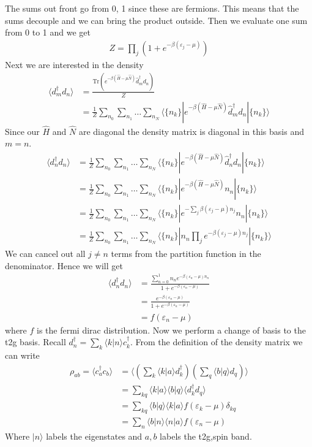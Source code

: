 \documentclass[11pt]{article}
\begin{document}
The sums out front go from 0, 1 since these are fermions. This means that the sums decouple and we can bring the product outside. Then we evaluate one sum from 0 to 1 and we get
\begin{gather}
    Z = \prod_j \left(1 + e^{-\beta(\varepsilon_j - \mu)}\right)
\end{gather}
Next we are interested in the density
\begin{align}
    \langle d^\dagger_m d_n \rangle &= \frac{\text{Tr}\left(e^{-\beta(\hat H - \mu \hat N)}\hat d_m^\dagger d_n\right)}{Z} \\\nonumber
    &= \frac{1}{Z} \sum_{n_0}\sum_{n_1}\ldots\sum_{n_N} \langle \{n_k\}|e^{-\beta(\hat H - \mu \hat N)}\hat d_m^\dagger d_n|\{n_k\}\rangle
\end{align}
Since our $\hat H$ and $\hat N$ are diagonal the density matrix is diagonal in this basis and $m = n$.
\begin{align}
    \langle d^\dagger_n d_n \rangle &=\frac{1}{Z}\sum_{n_0}\sum_{n_1}\ldots\sum_{n_N} \langle \{n_k\}|e^{-\beta(\hat H - \mu \hat N)}\hat d_n^\dagger d_n|\{n_k\}\rangle \\\nonumber
    &=\frac{1}{Z} \sum_{n_0}\sum_{n_1}\ldots\sum_{n_N} \langle \{n_k\}|e^{-\beta(\hat H - \mu \hat N)}n_n|\{n_k\}\rangle \\\nonumber
    &=\frac{1}{Z} \sum_{n_0}\sum_{n_1}\ldots\sum_{n_N} \langle \{n_k\}|e^{-\sum_j\beta(\varepsilon_j - \mu)n_j}n_n|\{n_k\}\rangle \\\nonumber
    &=\frac{1}{Z} \sum_{n_0}\sum_{n_1}\ldots\sum_{n_N} \langle \{n_k\}|n_n \prod_je^{-\beta(\varepsilon_j - \mu)n_j}|\{n_k\}\rangle
\end{align}
We can cancel out all $j\ne n$ terms from the partition function in the denominator. Hence we will get
\begin{align}
      \langle d^\dagger_n d_n \rangle &=\frac{\sum_{n=0}^1n_ne^{-\beta(\varepsilon_n - \mu)n_n}}{1+e^{-\beta(\varepsilon_n-\mu)}} \\\nonumber
      &= \frac{e^{-\beta(\varepsilon_n - \mu)}}{1+e^{-\beta(\varepsilon_n-\mu)}} \\\nonumber
      &= f(\varepsilon_n-\mu )
\end{align}
where $f$ is the fermi dirac distribution. Now we perform a change of basis to the t2g basis. Recall $d_n^{\dagger} = \sum_k \langle k|n\rangle c^\dagger_k$. From the definition of the density matrix we can write
\begin{align}
    \rho_{ab} = \langle c_a^\dagger c_b\rangle &= \langle \left( \sum_k \langle k|a\rangle d_k^\dagger \right ) \left(\sum_q \langle b|q\rangle d_q \right) \rangle \\\nonumber
    &= \sum_{kq}\langle k|a\rangle\langle b | q\rangle \langle d_k^\dagger d_q\rangle \\\nonumber
    &= \sum_{kq} \langle b|q\rangle\langle k|a\rangle f(\varepsilon_k - \mu)\delta_{kq} \\\nonumber
    &= \sum_n \langle b|n\rangle\langle n|a\rangle f(\varepsilon_n -\mu)
\end{align}
Where $|n\rangle$ labels the eigenstates and $a,b$ labels the t2g,spin band.
\end{document}

